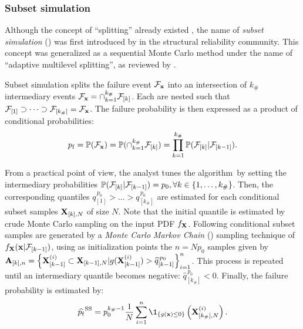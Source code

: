 

\subsubsection{Subset simulation}
Although the concept of ``splitting'' already existed \citep{kahn_1951_splitting}, the name of \textit{subset simulation} () was first introduced by \citet{AuBeck2001} in the structural reliability community. 
This concept was generalized as a sequential Monte Carlo method under the name of ``adaptive multilevel splitting'', as reviewed by \citet{cerou_2019_sequentialMC}. 

Subset simulation splits the failure event $\mathcal{F}_{{\bf x}}$ into an intersection of $k_\#$ intermediary events $\mathcal{F}_{{\bf x}} = \cap_{k=1}^{k_\#} \mathcal{F}_{[k]}$. 
Each are nested such that $\mathcal{F}_{[1]} \supset \dots \supset \mathcal{F}_{[k_\#]} = \mathcal{F}_{{\bf x}}$.
The failure probability is then expressed as a product of conditional probabilities:
\begin{equation}
    p_\mathrm{f} = \mathbb{P}(\mathcal{F}_{{\bf x}}) = \mathbb{P}(\cap_{k=1}^{k_\#} \mathcal{F}_{[k]}) = \prod_{k=1}^{k_\#} \mathbb{P}(\mathcal{F}_{[k]} | \mathcal{F}_{[k-1]}).
\end{equation}

From a practical point of view, the analyst tunes the algorithm\footnotemark~by setting the intermediary probabilities $\mathbb{P}(\mathcal{F}_{[k]} | \mathcal{F}_{[k-1]}) = p_0, \forall k \in \{1, \dots, k_\# \}$. 
Then, the corresponding quantiles $q_{[1]}^{\, p_0} > \dots > q_{[k_\#]}^{\, p_0}$ are estimated for each conditional subset samples ${\bf X}_{[k], N}$ of size $N$. 
Note that the initial quantile is estimated by crude Monte Carlo sampling on the input PDF $f_{{\bf X}}$. 
Following conditional subset samples are generated by a \textit{Monte Carlo Markov Chain} () sampling technique of 
$f_{{\bf X}}({\bf x} |\mathcal{F}_{[k-1]})$, using as initialization points the $n= N p_0$ samples given by $\mathbf{A}_{[k], n}=\left\{{\bf X}_{[k-1]}^{(i)} \subset {\bf X}_{[k-1], N}| g({\bf X}_{[k-1]}^{(i)}) > \widehat{q}_{[k-1]}^{\, p_0} \right\}_{i=1}^n$. 
This process is repeated until an intermediary quantile becomes negative: $\widehat{q}_{[k_\#]}^{\, p_0} < 0$. 
Finally, the failure probability is estimated by:
\begin{equation}
    \widehat{\pf}^{\mathrm{SS}} = p_0^{k_\# -1} \frac1N \sum_{i=1}^n \1_{\{g(\bx) \leq 0\}} \left(\bX_{[k_\#],N}^{(i)}\right).
    \label{eq:pf_SS}
\end{equation}

